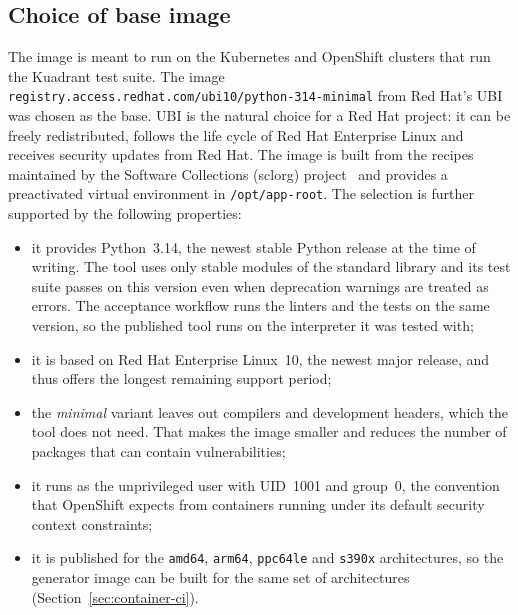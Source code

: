 \documentclass[
  digital, %
  oneside, %
  lof,     %
  nolot,     %
]{fithesis4}
\begin{document}
\subsection{Choice of base image}
\label{sec:container-base-image}
The image is meant to run on the Kubernetes and OpenShift clusters that run the
Kuadrant test suite. The image
\texttt{registry.access.redhat.com/ubi10/python-314-minimal} from Red Hat's
\gls{UBI}~\cite{ubi} was chosen as the base. \gls{UBI} is the natural choice for
a Red Hat project: it can be freely redistributed, follows the life cycle of Red
Hat Enterprise Linux and receives security updates from Red Hat. The image is
built from the recipes maintained by the Software Collections (sclorg)
project~\cite{sclorg-python} and provides a preactivated virtual environment in
\texttt{/opt/app-root}. The selection is further supported by the following
properties:
%
\begin{itemize}
  \item it provides Python~3.14, the newest stable Python release at the time of
        writing. The tool uses only stable modules of the standard library and
        its test suite passes on this version even when deprecation warnings are
        treated as errors. The acceptance workflow runs the linters and the
        tests on the same version, so the published tool runs on the
        interpreter it was tested with;
  \item it is based on Red Hat Enterprise Linux~10, the newest major release,
        and thus offers the longest remaining support period;
  \item the \emph{minimal} variant leaves out compilers and development
        headers, which the tool does not need. That makes the image smaller and
        reduces the number of packages that can contain vulnerabilities;
  \item it runs as the unprivileged user with \gls{UID}~1001 and group~0, the
        convention that OpenShift expects from containers running under its
        default security context constraints;
  \item it is published for the \texttt{amd64}, \texttt{arm64},
        \texttt{ppc64le} and \texttt{s390x} architectures, so the generator image
        can be built for the same set of architectures
        (Section~\ref{sec:container-ci}).
\end{itemize}
\end{document}

